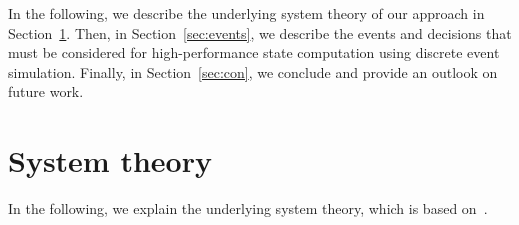 \documentclass[graybox]{svmult}
\begin{document}
In the following, we describe the underlying system theory of our approach in Section~\ref{sec:theory}.
Then, in Section~\ref{sec:events}, we describe the events and decisions that must be considered for high-performance state computation using discrete event simulation. 
Finally, in Section~\ref{sec:con}, we conclude and provide an outlook on future work.
\vspace{-2mm}

\section{System theory}
\label{sec:theory}
In the following, we explain the underlying system theory, which is based on~\cite{Ascher2014,Ascher2015,Ascher2016,Ascher2017}.



\end{document}
